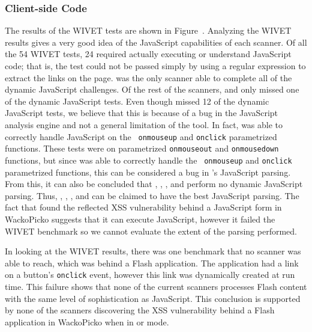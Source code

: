 \subsubsection{Client-side Code}
The results of the WIVET tests are shown in Figure~.
Analyzing  the  WIVET  results  gives  a  very good  idea  of  the  JavaScript
capabilities of each scanner. Of all the 54 WIVET tests, 
24 required actually executing  or understand JavaScript code; that  is, the test
could not  be passed  simply by  using a regular  expression to
extract the links on  the page. 
\webinspect{} was  the only scanner
able to complete  all of the dynamic 
JavaScript  challenges.   Of  the  rest  of  the   scanners,  \acunetix{}  and
\ntospider{} only missed one of the dynamic JavaScript tests. 
Even though \hailstorm{} missed 12 of
the dynamic JavaScript  tests, we believe that this is because of a bug in the 
JavaScript analysis engine and not a general limitation of the tool. In fact,
\hailstorm{} was able to correctly handle JavaScript on the {\tt
onmouseup} and {\tt  onclick} parametrized functions. 
These tests were on parametrized  {\tt onmouseout} and
{\tt onmousedown} functions,  but since \hailstorm{} was able  to correctly handle the {\tt
onmouseup} and {\tt  onclick} parametrized functions, this can  be considered a
bug in \hailstorm{}'s JavaScript parsing.  From this, it can also be concluded
that \appscan{},  \grendelscan{}, \milescan{},  and \waf{} perform  no dynamic
JavaScript   parsing.  Thus,   \webinspect,  \acunetix{},   \ntospider{},  and
\hailstorm{} can  be claimed  to have the  best JavaScript parsing.   The fact
that \nstalker{}  found the reflected  XSS vulnerability behind  a JavaScript
form in WackoPicko suggests that  it can execute JavaScript, however it failed
the WIVET benchmark so we cannot evaluate the extent of the parsing performed.


In looking at the WIVET results, there was one benchmark that no scanner was
able to reach, which was behind a Flash application. The application had a
link on a button's {\tt onclick} event, however this link was dynamically
created at run time. This failure shows that none of the
current scanners processes Flash content with the same level of
sophistication as JavaScript.  This conclusion is supported by none of
the scanners discovering the XSS vulnerability behind a Flash
application in WackoPicko when in \initial{} or \config{} mode.


